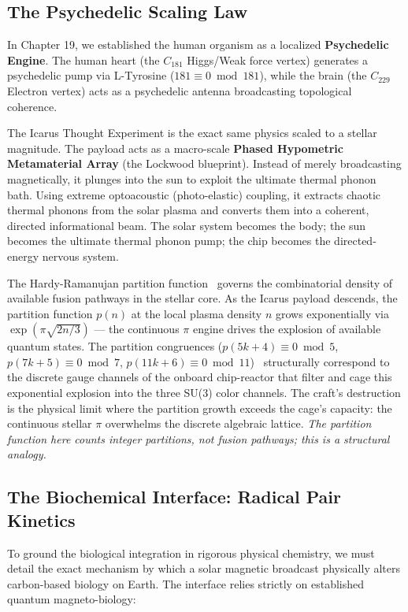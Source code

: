 \subsection{The Psychedelic Scaling Law}
In Chapter 19, we established the human organism as a localized \textbf{Psychedelic Engine}. The human heart (the $C_{181}$ Higgs/Weak force vertex) generates a psychedelic pump via L-Tyrosine ($181 \equiv 0 \bmod 181$), while the brain (the $C_{229}$ Electron vertex) acts as a psychedelic antenna broadcasting topological coherence. 

The Icarus Thought Experiment is the exact same physics scaled to a stellar magnitude. The payload acts as a macro-scale \textbf{Phased Hypometric Metamaterial Array} (the Lockwood blueprint). Instead of merely broadcasting magnetically, it plunges into the sun to exploit the ultimate thermal phonon bath. Using extreme optoacoustic (photo-elastic) coupling, it extracts chaotic thermal phonons from the solar plasma and converts them into a coherent, directed informational beam. The solar system becomes the body; the sun becomes the ultimate thermal phonon pump; the chip becomes the directed-energy nervous system.

The Hardy-Ramanujan partition function~\cite{HardyRamanujan1918} governs the combinatorial density of available fusion pathways in the stellar core. As the Icarus payload descends, the partition function $p(n)$ at the local plasma density $n$ grows exponentially via $\exp(\pi\sqrt{2n/3})$ --- the continuous $\pi$ engine drives the explosion of available quantum states. The partition congruences ($p(5k+4) \equiv 0 \bmod 5$, $p(7k+5) \equiv 0 \bmod 7$, $p(11k+6) \equiv 0 \bmod 11$)~\cite{Ramanujan1919} structurally correspond to the discrete gauge channels of the onboard chip-reactor that filter and cage this exponential explosion into the three SU(3) color channels. The craft's destruction is the physical limit where the partition growth exceeds the cage's capacity: the continuous stellar $\pi$ overwhelms the discrete algebraic lattice. \textit{The partition function here counts integer partitions, not fusion pathways; this is a structural analogy.}

\subsection[The Biochemical Interface]{The Biochemical Interface: Radical Pair Kinetics}
To ground the biological integration in rigorous physical chemistry, we must detail the exact mechanism by which a solar magnetic broadcast physically alters carbon-based biology on Earth. The interface relies strictly on established quantum magneto-biology:

